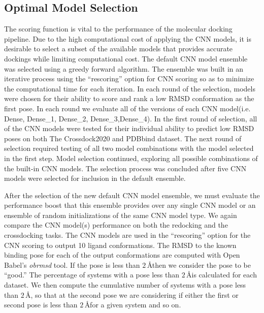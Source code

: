 \documentclass[journal=jcisd8,manuscript=article]{achemso}
\begin{document}
\subsection{Optimal Model Selection}
The scoring function is vital to the performance of the molecular docking pipeline. Due to the high computational cost of applying the CNN models, it is desirable to select a subset of the available models that provides accurate dockings while limiting computational cost. The default CNN model ensemble was selected using a greedy forward algorithm. The ensemble was built in an iterative process using the ``rescoring'' option for CNN scoring so as to minimize the computational time for each iteration. In each round of the selection, models were chosen for their ability to score and rank a low RMSD conformation as the first pose. In each round we evaluate all of the versions of each CNN model(i.e. Dense, Dense\_1, Dense\_2, Dense\_3,Dense\_4). In the first round of selection, all of the CNN models were tested for their individual ability to predict low RMSD poses on both The Crossdock2020 and PDBbind dataset. The next round of selection required testing of all two model combinations with the model selected in the first step. Model selection continued, exploring all possible combinations of the built-in CNN models. The selection process was concluded after five CNN models were selected for inclusion in the default ensemble.

After the selection of the new default CNN model ensemble, we must evaluate the performance boost that this ensemble provides over any single CNN model or an ensemble of random initializations of the same CNN model type. We again compare the CNN model(s) performance on both the redocking and the crossdocking tasks. The CNN models are used in the ``rescoring'' option for the CNN scoring to output 10 ligand conformations. The RMSD to the known binding pose for each of the output conformations are computed with Open Babel's \textit{obrmsd} tool. If the pose is less than $2\,$\AA then we consider the pose to be ``good.'' The percentage of systems with a pose less than $2\,$\AA is calculated for each dataset. We then compute the cumulative number of systems with a pose less than $2\,$\AA, so that at the second pose we are considering if either the first or second pose is less than $2\,$\AA for a given system and so on.
\end{document}
